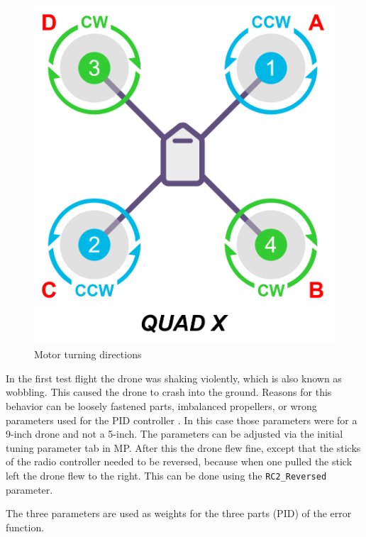 \documentclass[svgnames]{article}
\begin{document}
\begin{figure}[ht]
	\centering
	\includegraphics[scale=0.4]{pictures/quadxcopy}
	\caption{Motor turning directions}
	\label{fig:quadx}
\end{figure}

	In the first test flight the drone was shaking violently, which is also known as wobbling. This caused the drone to crash  into the ground. Reasons for this behavior can be loosely fastened parts, imbalanced propellers, or wrong parameters used for the \gls{PID} controller \cite{dronewobblevideo}. In this case those parameters were for a 9-inch drone and not a 5-inch. The parameters can be adjusted via the initial tuning parameter tab in \gls{MP}. After this the drone flew fine, except that the sticks of the radio controller needed to be reversed, because when one pulled the stick left the drone flew to the right. This can be done using the \lstinline|RC2_Reversed| parameter.

	\begin{Explanation}
		\item The three parameters are used as weights for the three parts (\gls{PID}) of the error function.
	\end{Explanation}
	
\end{document}
